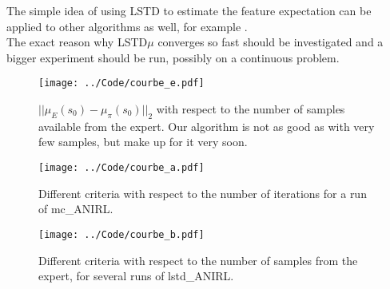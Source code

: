 \documentclass{jfpda2011}
\begin{document}
The simple idea of using LSTD to estimate the feature expectation can be applied to other algorithms as well, for example \cite{abbeel2004apprenticeship,syed2008apprenticeship,syed2008game,ziebart2008maximum}.\\

The exact reason why LSTD$\mu$ converges so fast should be investigated and a bigger experiment should be run, possibly on a continuous problem.\\
\begin{figure}
\texttt{[image: ../Code/courbe\_e.pdf]}
\caption{$||\mu_E(s_0)-\mu_\pi(s_0)||_2$ with respect to the number of samples available from the expert. Our algorithm is not as good as \citet{abbeel2004apprenticeship} with very few samples, but make up for it very soon.}
\label{fig:E}
\end{figure}
\label{sec:perf}
\begin{figure}
\texttt{[image: ../Code/courbe\_a.pdf]}
\caption{Different criteria with respect to the number of iterations for a run of mc\_ANIRL.}
\label{fig:A}
\end{figure}
\begin{figure}
\texttt{[image: ../Code/courbe\_b.pdf]}
\caption{Different criteria with respect to the number of samples from the expert, for several runs of lstd\_ANIRL.}
\label{fig:B}
\end{figure}
%

\end{document}
